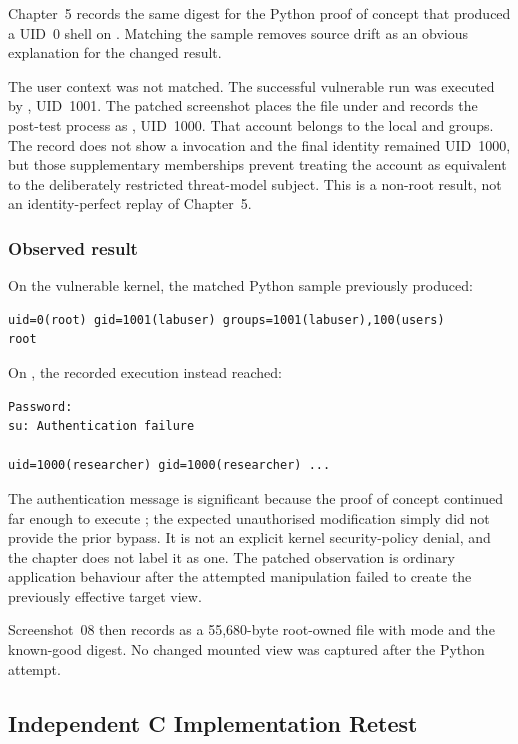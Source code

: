 Chapter~5 records the same digest for the Python proof of concept that produced
a UID~0 shell on . Matching the sample removes source
drift as an obvious explanation for the changed result.

The user context was not matched. The successful vulnerable run was executed by
, UID~1001. The patched screenshot places the file under
 and records the post-test process as
, UID~1000. That account belongs to the local  and
 groups. The record does not show a  invocation and the
final identity remained UID~1000, but those supplementary memberships prevent
treating the account as equivalent to the deliberately restricted
 threat-model subject. This is a non-root result, not an
identity-perfect replay of Chapter~5.

\subsubsection{Observed result}

On the vulnerable kernel, the matched Python sample previously produced:

\begin{lstlisting}
uid=0(root) gid=1001(labuser) groups=1001(labuser),100(users)
root
\end{lstlisting}

On , the recorded execution instead reached:

\begin{lstlisting}
Password:
su: Authentication failure

uid=1000(researcher) gid=1000(researcher) ...
\end{lstlisting}

The authentication message is significant because the proof of concept
continued far enough to execute ; the expected unauthorised
modification simply did not provide the prior bypass. It is not an explicit
kernel security-policy denial, and the chapter does not label it as one. The
patched observation is ordinary application behaviour after the attempted
manipulation failed to create the previously effective target view.

Screenshot~08 then records  as a 55,680-byte root-owned file
with mode  and the known-good digest. No changed mounted view was
captured after the Python attempt.

\subsection{Independent C Implementation Retest}

